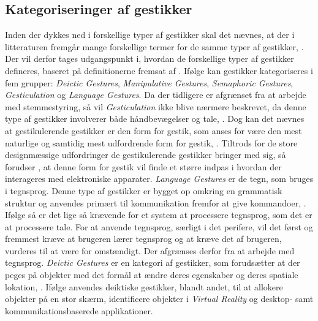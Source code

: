 \subsection{Kategoriseringer af gestikker}
\label{KategoriseringerAfGestikker}
%
Inden der dykkes ned i forskellige typer af gestikker skal det nævnes, at der i litteraturen fremgår mange forskellige termer for de samme typer af gestikker, \parencite[s. 3]{PDF:ATaxonomyOfGestures}. Der vil derfor tages udgangspunkt i, hvordan de forskellige typer af gestikker defineres, baseret på definitionerne fremsat af \textcite[ss. 4-9]{PDF:ATaxonomyOfGestures}. Ifølge \textcite[s. 4]{PDF:ATaxonomyOfGestures} kan gestikker kategoriseres i fem grupper: \textit{Deictic Gestures}, \textit{Manipulative Gestures}, \textit{Semaphoric Gestures}, \textit{Gesticulation} og \textit{Language Gestures}. \blankline
%
Da der tidligere er afgrænset fra at arbejde med stemmestyring, så vil \textit{Gesticulation} ikke blive nærmere beskrevet, da denne type af gestikker involverer både håndbevægelser og tale, \parencite[s. 7]{PDF:ATaxonomyOfGestures}. Dog kan det nævnes at gestikulerende gestikker er den form for gestik, som anses for være den mest naturlige og samtidig mest udfordrende form for gestik, \parencite[s. 7]{PDF:ATaxonomyOfGestures}. Tiltrods for de store designmæssige udfordringer de gestikulerende gestikker bringer med sig, så forudser \textcite[s. 28]{PDF:ATaxonomyOfGestures}, at denne form for gestik vil finde et større indpas i hvordan der interageres med elektroniske apparater. \blankline
%
\textit{Language Gestures} er de tegn, som bruges i tegnsprog. Denne type af gestikker er bygget op omkring en grammatisk struktur og anvendes primært til kommunikation fremfor at give kommandoer, \parencite[s. 8]{PDF:ATaxonomyOfGestures}. Ifølge \textcite[s. 8]{PDF:ATaxonomyOfGestures} så er det lige så krævende for et system at processere tegnsprog, som det er at processere tale. For at anvende tegnsprog, særligt i det perifere, vil det først og fremmest kræve at brugeren lærer tegnsprog og at kræve det af brugeren, vurderes til at være for omstændigt. Der afgrænses derfor fra at arbejde med tegnsprog. \blankline
%  
\textit{Deictic Gestures} er en kategori af gestikker, som forudsætter at der peges på objekter med det formål at ændre deres egenskaber og deres spatiale lokation, \parencite[s. 4]{PDF:ATaxonomyOfGestures}. Ifølge \textcite[ss. 4-5]{PDF:ATaxonomyOfGestures} anvendes deiktiske gestikker, blandt andet, til at allokere objekter på en stor skærm, identificere objekter i \textit{Virtual Reality} og desktop- samt kommunikationsbaserede applikationer. \blankline
